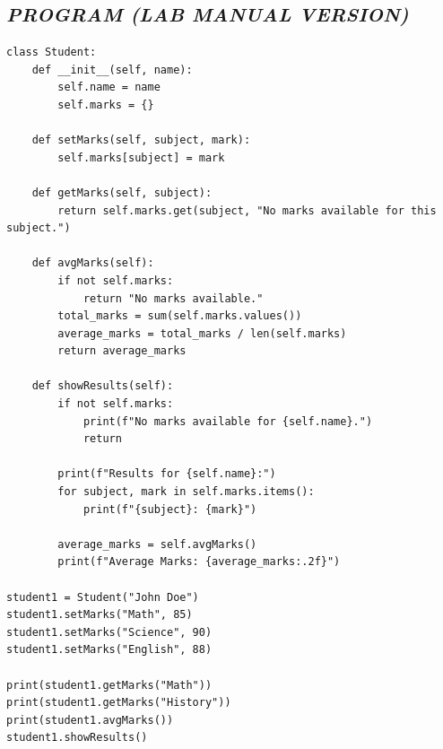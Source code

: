 \documentclass[11pt,a4paper]{article}
\begin{document}
\subsection*{\textit{PROGRAM (LAB MANUAL VERSION)}}
\begin{lstlisting}[style=pythonstyle]
class Student: 
    def __init__(self, name): 
        self.name = name 
        self.marks = {} 
 
    def setMarks(self, subject, mark): 
        self.marks[subject] = mark 
 
    def getMarks(self, subject): 
        return self.marks.get(subject, "No marks available for this subject.") 
 
    def avgMarks(self): 
        if not self.marks: 
            return "No marks available." 
        total_marks = sum(self.marks.values()) 
        average_marks = total_marks / len(self.marks) 
        return average_marks 
 
    def showResults(self): 
        if not self.marks: 
            print(f"No marks available for {self.name}.") 
            return 
         
        print(f"Results for {self.name}:") 
        for subject, mark in self.marks.items(): 
            print(f"{subject}: {mark}") 
         
        average_marks = self.avgMarks() 
        print(f"Average Marks: {average_marks:.2f}") 

student1 = Student("John Doe") 
student1.setMarks("Math", 85) 
student1.setMarks("Science", 90) 
student1.setMarks("English", 88) 

print(student1.getMarks("Math")) 
print(student1.getMarks("History")) 
print(student1.avgMarks()) 
student1.showResults()
\end{lstlisting}
\end{document}
